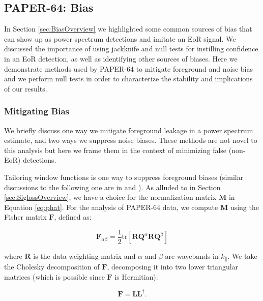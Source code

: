 \documentclass[preprint2,numberedappendix,tighten]{aastex6}  %
\begin{document}

\subsection{PAPER-64: Bias}
\label{sec:Bias}

In Section \ref{sec:BiasOverview} we highlighted some common sources of bias that can show up as power spectrum 
detections and imitate an EoR signal. We discussed the importance of using jackknife and null tests for instilling confidence in an EoR 
detection, as well as identifying other sources of biases. Here we demonstrate methods used by PAPER-64 to mitigate 
foreground and noise bias and we perform null tests in order to characterize the stability and implications of our results.

\subsubsection{Mitigating Bias}

We briefly discuss one way we mitigate foreground leakage in a power spectrum estimate, and two ways we 
suppress noise biases. These methods are not novel to this analysis but here we frame them in the context of minimizing false 
(non-EoR) detections. 

Tailoring window functions is one way to suppress foreground biases (similar discussions to the following one are in \citet{liu_et_al2014b} and ). As alluded to in Section \ref{sec:SiglossOverview}, we 
have a choice for the normalization matrix $\textbf{M}$ in Equation \eqref{eq:phat}. For the analysis of PAPER-64 data, we 
compute $\textbf{M}$ using the Fisher matrix $\textbf{F}$, defined as:

\begin{equation}
\textbf{F}_{\alpha\beta} = \frac{1}{2} \text{tr} [\textbf{R}\textbf{Q}^{\alpha}\textbf{R}\textbf{Q}^{\beta} ]
\end{equation}

\noindent where $\textbf{R}$ is the data-weighting matrix and $\alpha$ and $\beta$ are wavebands in $k_{\parallel}$. We take 
the Cholesky decomposition of $\textbf{F}$, decomposing it into two lower triangular matrices (which is possible since $\textbf{F}$ is Hermitian):

\begin{equation}
\textbf{F} = \textbf{LL}^{\dagger}.
\end{equation}
\end{document}
